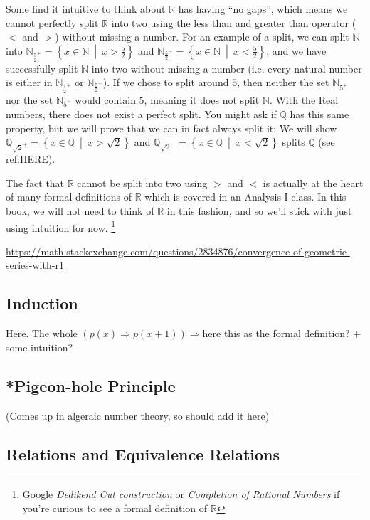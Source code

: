 \documentclass{book}
\newcommand{\N}{{\mathbb{N}}}
\newcommand{\Q}{{\mathbb{Q}}}
\newcommand{\R}{{\mathbb{R}}}
\newcommand{\Rw}{\Rightarrow}
\newcommand{\set}[2]{\left\{#1 \ \middle|\ #2\right\}}
\begin{document}
Some find it intuitive to think about $\R$ has having ``no gaps'', which means we cannot perfectly split $\R$ into two
using the less than and greater than operator ($<$ and $>$) without missing a number. For an example of a split, we
can split $\N$  into $\N_{ \frac{5}{2}^+} = \set{x \in \N}{x > \frac{5}{2}}$ and $\N_{ \frac{5}{2}^-} = \set{x \in \N}{x
< \frac{5}{2}}$, and we have successfully split $\N$ into two without missing a number (i.e. every natural number is
either in $\N_{ \frac{5}{2}^+}$ or $\N_{ \frac{5}{2}^-}$). If we chose to split around $5$, then neither the set
$\N_{5^+}$ nor the set $\N_{5^-}$ would contain $5$, meaning it does not split $\N$. With the Real numbers, there does
not exist a perfect split. You might ask if $\Q$ has this same property, but we will prove that we can in fact always
split it: We will show $\Q_{\sqrt{2}^+} = \set{x \in \Q}{x > \sqrt{2}}$ and $\Q_{\sqrt{2}^-} = \set{x \in \Q}{x
< \sqrt{2}}$ splits $\Q$ (see ref:HERE).

The fact that $\R$ cannot be split into two using $>$ and $<$ is actually at the heart of many formal definitions of  $\R$
which is covered in an Analysis I class. In this book, we will not need to think of $\R$ in this fashion, and so we'll stick with just
using intuition for now. \footnote{Google \emph{Dedikend Cut construction} or \emph{Completion of Rational Numbers} if
you're curious to see a formal definition of $\R$}


\begin{center}
	\url{https://math.stackexchange.com/questions/2834876/convergence-of-geometric-series-with-r1}
\end{center}
\subsection{Induction}

Here. The whole $(p(x) \Rw p(x+1)) \Rw \text{here}$ this as the formal definition? + some intuition?

\subsection{*Pigeon-hole Principle}\label{sec:pigeonholePrinciple}

(Comes up in algeraic number theory, so should add it here)

\subsection{Relations and Equivalence Relations}\label{sec:equivRelations}
\end{document}
